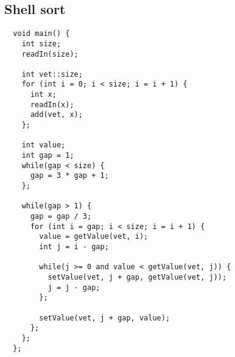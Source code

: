 \documentclass[a4paper, 12pt, article]{memoir}
\begin{document}
\subsection{Shell sort}
\label{subsec:shelsort}
\begin{lstlisting}
  void main() {
    int size;
    readIn(size);

    int vet::size;
    for (int i = 0; i < size; i = i + 1) {
      int x;
      readIn(x);
      add(vet, x);
    };

    int value;
    int gap = 1;
    while(gap < size) {
      gap = 3 * gap + 1;
    };

    while(gap > 1) {
      gap = gap / 3;
      for (int i = gap; i < size; i = i + 1) {
        value = getValue(vet, i);
        int j = i - gap;

        while(j >= 0 and value < getValue(vet, j)) {
          setValue(vet, j + gap, getValue(vet, j));
          j = j - gap;
        };

        setValue(vet, j + gap, value);
      };
    };
  };
\end{lstlisting}
\end{document}
